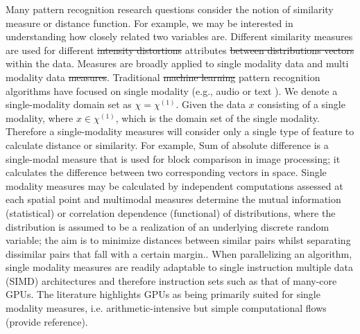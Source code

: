\documentclass[10pt]{article}[draft]
\begin{document}
Many pattern recognition research questions consider the notion of similarity measure or distance function. For example, we may be interested in understanding how closely related two variables are. Different similarity measures are used for different \st{intensity distortions} attributes \st{between distributions vectors} within the data. Measures are broadly applied to single modality data and multi modality data \st{measures}.  Traditional \st{machine learning} pattern recognition algorithms have focused on single modality (e.g., audio  or text ). We denote a single-modality domain set as $\chi =  \chi^{(1)} $. Given the data $x$ consisting of a single modality, where $x \in \chi^{(1)}$, which is the domain set of the single modality.  Therefore a single-modality measures will consider only a single type of feature to calculate distance or similarity.  For example, Sum of absolute difference is a single-modal measure that is used for block comparison in image processing; it calculates the difference between two corresponding vectors in space. Single modality measures may be calculated by independent computations assessed at each spatial point and multimodal measures determine the mutual information (statistical) or correlation dependence (functional) of distributions, where the  distribution is assumed to be a realization of an underlying discrete random variable; the aim is to minimize distances between similar pairs whilst separating dissimilar pairs that fall with a certain margin.. When parallelizing an algorithm, single modality measures are readily adaptable to single instruction multiple data (SIMD) architectures and therefore instruction sets such as that of many-core GPUs.  The literature highlights GPUs as being primarily suited for single modality measures, i.e. arithmetic-intensive but simple computational flows (provide reference).
		
\end{document}
